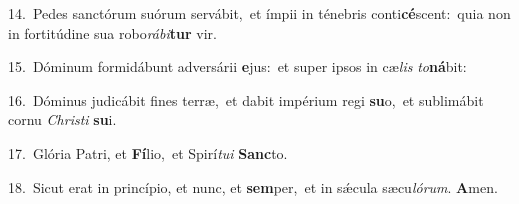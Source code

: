 {\numbfont\textcolor{\numbcolor}{14.}}~Pedes sanctórum suórum servábit,~\dagger et ímpii in ténebris conti\-\textbf{cé}\-scent:~\star quia non in fortitúdine sua robo\-\textit{rá}\-\textit{bi}\textbf{tur} vir.\par
{\numbfont\textcolor{\numbcolor}{15.}}~Dóminum formidábunt adversárii \textbf{e}\-jus:~\star et super ipsos in cæ\textit{lis} \textit{to}\-\textbf{ná}bit:\par
{\numbfont\textcolor{\numbcolor}{16.}}~Dóminus judicábit fines terræ,~\dagger et dabit impérium regi \textbf{su}\-o,~\star et sublimábit cornu \textit{Chris}\-\textit{ti} \textbf{su}\-i.\par
{\numbfont\textcolor{\numbcolor}{17.}}~Glória Patri, et \textbf{Fí}\-lio,~\star et Spirí\-\textit{tu}\-\textit{i} \textbf{Sanc}\-to.\par
{\numbfont\textcolor{\numbcolor}{18.}}~Sicut erat in princípio, et nunc, et \textbf{sem}\-per,~\star et in sǽcula sæcu\-\textit{ló}\-\textit{rum}. \textbf{A}\-men.\par
